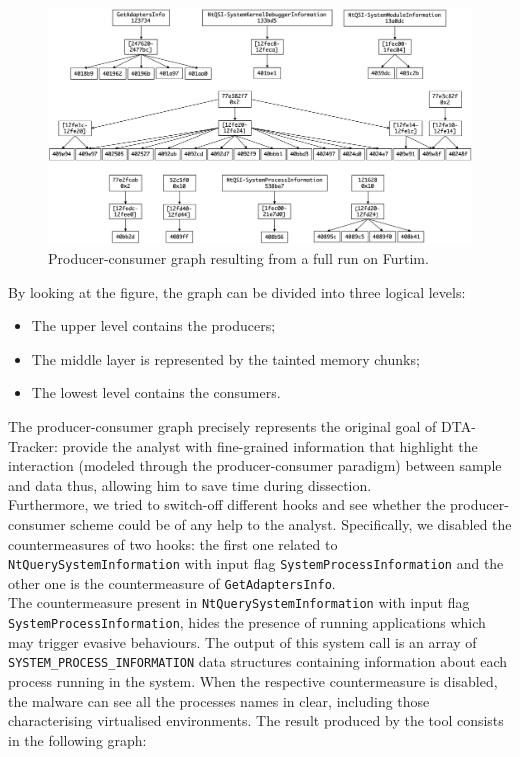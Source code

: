 \documentclass[LaM,binding=0.6cm]{sapthesis}
\begin{document}
\begin{figure}[h!]
\centering%
\includegraphics[width=\textwidth]{images/eval1_def}
\caption{Producer-consumer graph resulting from a full run on Furtim.}
\label{fig:eval1}
\end{figure}

By looking at the figure, the graph can be divided into three logical levels:
\begin{itemize}
\item The upper level contains the producers;
\item The middle layer is represented by the tainted memory chunks;
\item The lowest level contains the consumers.
\end{itemize}
The producer-consumer graph precisely represents the original goal of DTA-Tracker: provide the analyst with fine-grained information that highlight the interaction (modeled through the producer-consumer paradigm) between sample and data thus, allowing him to save time during dissection.\\
Furthermore, we tried to switch-off different hooks and see whether the producer-consumer scheme could be of any help to the analyst. Specifically, we disabled the countermeasures of two hooks: the first one related to \texttt{NtQuerySystemInformation} with input flag \texttt{SystemProcessInformation} and the other one is the countermeasure of \texttt{GetAdaptersInfo}.\\

The countermeasure present in \texttt{NtQuerySystemInformation} with input flag \texttt{SystemProcessInformation}, hides the presence of running applications which may trigger evasive behaviours. The output of this system call is an array of \texttt{SYSTEM\_PROCESS\_INFORMATION} data structures containing information about each process running in the system. When the respective countermeasure is disabled, the malware can see all the processes names in clear, including those characterising virtualised environments. The result produced by the tool consists in the following graph:
\end{document}
